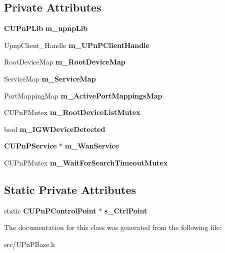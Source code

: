 \subsection*{Private Attributes}
\begin{DoxyCompactItemize}
\item 
{\bf CUPnPLib} {\bfseries m\_\-upnpLib}\label{classCUPnPControlPoint_af6386a4ba344efd8e67a50647810f38a}

\item 
UpnpClient\_\-Handle {\bfseries m\_\-UPnPClientHandle}\label{classCUPnPControlPoint_af695e661011f637274327f8478a4da51}

\item 
RootDeviceMap {\bfseries m\_\-RootDeviceMap}\label{classCUPnPControlPoint_a1d4c5aa61291a08d12049d482e6d48c1}

\item 
ServiceMap {\bfseries m\_\-ServiceMap}\label{classCUPnPControlPoint_a581bfc8b7e560df70d416f56c6b4d647}

\item 
PortMappingMap {\bfseries m\_\-ActivePortMappingsMap}\label{classCUPnPControlPoint_ae5146ebf1f06419ac79b98c9c0f98095}

\item 
CUPnPMutex {\bfseries m\_\-RootDeviceListMutex}\label{classCUPnPControlPoint_a054c1063bf9727939da51d5d91e04d47}

\item 
bool {\bfseries m\_\-IGWDeviceDetected}\label{classCUPnPControlPoint_ae51d4d63a6d063ef1e940e7ea0632471}

\item 
{\bf CUPnPService} $\ast$ {\bfseries m\_\-WanService}\label{classCUPnPControlPoint_a5b9657f91439c3c4004201830d39d6bf}

\item 
CUPnPMutex {\bfseries m\_\-WaitForSearchTimeoutMutex}\label{classCUPnPControlPoint_ae19440c6d5f5c798596b7c100ac709d0}

\end{DoxyCompactItemize}
\subsection*{Static Private Attributes}
\begin{DoxyCompactItemize}
\item 
static {\bf CUPnPControlPoint} $\ast$ {\bfseries s\_\-CtrlPoint}\label{classCUPnPControlPoint_acbcacb8278c09f43ad9b1a6b30406842}

\end{DoxyCompactItemize}


The documentation for this class was generated from the following file:\begin{DoxyCompactItemize}
\item 
src/UPnPBase.h\end{DoxyCompactItemize}
